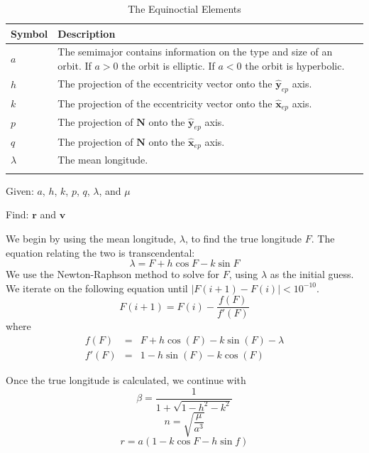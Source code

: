 \begin{table} \caption{The Equinoctial Elements}
\centering {}
\begin{tabular}{p{.5 in} p{5.0 in}}
  \hline\hline
   Symbol &  Description \\
  \hline
  $a$ &  The semimajor contains information on the type and size of an orbit.  If $a>0$ the orbit is elliptic.  If $a < 0$ the orbit is hyperbolic. \\
%
  $h$ &  The projection of the eccentricity vector onto the $\hat{\mathbf{y}}_{ep}$ axis. \\
  $k$ & The projection of the eccentricity vector onto the $\hat{\mathbf{x}}_{ep}$ axis. \\
  $p$ &  The projection of $\mathbf{N}$  onto the $\hat{\mathbf{y}}_{ep}$ axis.\\
  $q$ & The projection of $\mathbf{N}$  onto the $\hat{\mathbf{x}}_{ep}$ axis.  \\
  $\lambda$ & The mean longitude. \\
  \hline\hline \label{Table:EquinoctialElements}
\end{tabular}
\end{table}

\noindent Given: $a$, $h$, $k$, $p$, $q$, $\lambda$, and $\mu$

\noindent Find: $\mathbf{r}$ and $\mathbf{v}$

We begin by using the mean longitude, $\lambda$, to find the true
longitude $F$.  The equation relating the two is transcendental:
\begin{equation}
     \lambda = F + h\cos{F} - k \sin{F}
\end{equation}
%
We use the Newton-Raphson method to solve for $F$, using $\lambda$
as the initial guess.  We iterate on the following equation until
$|F(i+1) - F(i)| < 10^{-10}$.
%
\begin{equation}
    F(i+1) = F(i) - \frac{f(F)}{f'(F)}
\end{equation}
%
where
%
\begin{eqnarray}
    f(F) &=& F + h \cos(F) - k\sin(F) - \lambda \\
    f'(F) &=& 1 - h \sin(F) - k \cos(F)
\end{eqnarray}

Once the true longitude is calculated, we continue with
%
\begin{equation}
   \beta = \frac{1}{1 + \sqrt{1 - h^2 - k^2}} \label{Eq:Beta}
\end{equation}
%
\begin{equation}
   n = \sqrt{\frac{\mu}{a^3}}
\end{equation}
%
\begin{equation}
   r = a(1 - k\cos{F} - h\sin{f})
\end{equation}

